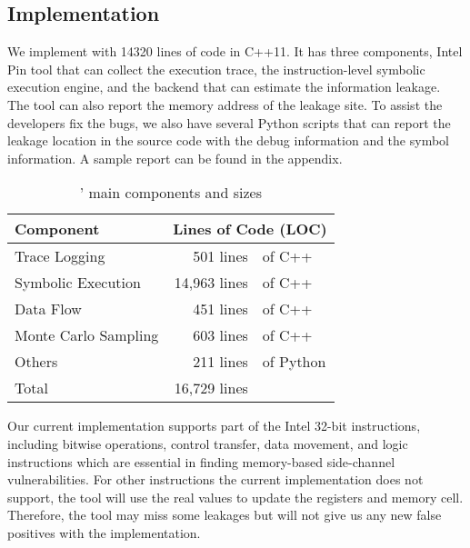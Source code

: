 \subsection{Implementation}
We implement \tool{} with 14320 lines of code in C++11. 
It has three components, Intel
Pin tool that can collect the execution trace, 
the instruction-level symbolic execution
engine, and the backend that can estimate the information leakage. 
The tool can also report the memory address of the leakage site. 
To assist the developers fix the bugs, we also have several Python 
scripts that can report the leakage location in the source code with the 
debug information and the symbol information. A sample report can be found
 in the appendix.

\begin{table}[h]
    \centering
    \caption{\tool{}' main components and sizes}
    \begin{tabular}{lr@{~}@{}l}
    \hline
    Component                            & \multicolumn{2}{c}{Lines of Code (LOC)}    \\ \hline
    Trace Logging                        & 501 lines &of C++       \\ 
    Symbolic Execution                   & 14,963 lines &of C++    \\ 
    Data Flow                            & 451 lines &of C++       \\
    Monte Carlo Sampling                 & 603 lines &of C++       \\ 
    Others                               & 211 lines &of Python    \\ \hline
    Total    & 16,729 lines & \\\hline
    \end{tabular}
\end{table}

Our current implementation supports part of the Intel 32-bit instructions, 
including bitwise operations, control transfer, data movement, and logic 
instructions which are essential in finding memory-based side-channel 
vulnerabilities. For other 
instructions the current implementation does not support, 
the tool will use the real values to update the registers and memory cell.
Therefore, the tool may miss some leakages but will not give us any new
false positives with the implementation.
